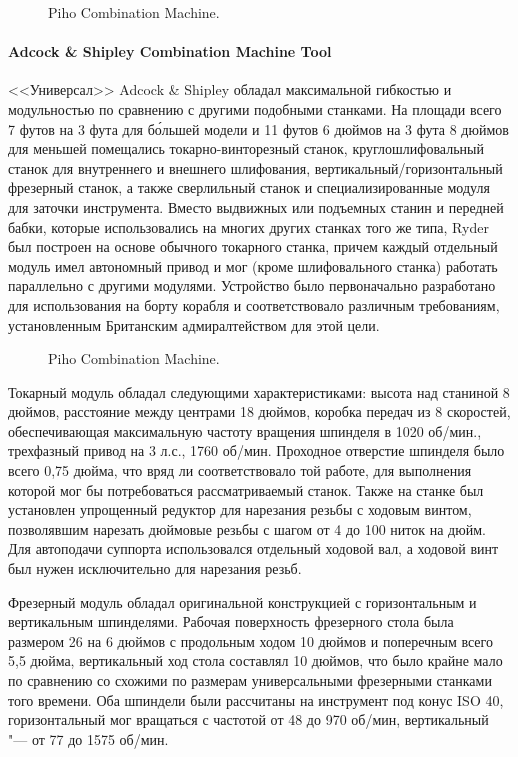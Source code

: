\begin{figure}[ht]
	\caption{Piho Combination Machine.}\label{fig:piho}
\end{figure}

\paragraph{Adcock \& Shipley Combination Machine Tool}

<<Универсал>> Adcock \& Shipley обладал максимальной гибкостью и модульностью по сравнению с другими подобными станками. На площади всего 7 футов на 3 фута для б\'ольшей модели и 11 футов 6 дюймов на 3 фута 8 дюймов для меньшей помещались токарно-винторезный станок, круглошлифовальный станок для внутреннего и внешнего шлифования, вертикальный/горизонтальный фрезерный станок, а также сверлильный станок и специализированные модуля для заточки инструмента. Вместо выдвижных или подъемных станин и передней бабки, которые использовались на многих других станках того же типа, Ryder был построен на основе обычного токарного станка, причем каждый отдельный модуль имел автономный привод и мог (кроме шлифовального станка) работать параллельно с другими модулями. Устройство было первоначально разработано для использования на борту корабля и соответствовало различным требованиям, установленным Британским адмиралтейством для этой цели. 

\begin{figure}[ht]
	\caption{Piho Combination Machine.}\label{fig:adcock-1}
\end{figure}

Токарный модуль обладал следующими характеристиками: высота над станиной 8 дюймов, расстояние между центрами 18 дюймов, коробка передач из 8 скоростей, обеспечивающая максимальную частоту вращения шпинделя в 1020 об/мин., трехфазный привод на 3 л.с., 1760 об/мин. Проходное отверстие шпинделя было всего 0,75 дюйма, что вряд ли соответствовало той работе, для выполнения которой мог бы потребоваться рассматриваемый станок. Также на станке был установлен упрощенный редуктор для нарезания резьбы с ходовым винтом, позволявшим нарезать дюймовые резьбы с шагом от 4 до 100 ниток на дюйм. Для автоподачи суппорта использовался отдельный ходовой вал, а ходовой винт был нужен исключительно для нарезания резьб.

Фрезерный модуль обладал оригинальной конструкцией с горизонтальным и вертикальным шпинделями. Рабочая поверхность фрезерного стола была размером 26 на 6 дюймов с продольным ходом 10 дюймов и поперечным всего 5,5 дюйма, вертикальный ход стола составлял 10 дюймов, что было крайне мало по сравнению со схожими по размерам универсальными фрезерными станками того времени. Оба шпиндели были рассчитаны на инструмент под конус ISO 40, горизонтальный мог вращаться с частотой от 48 до 970 об/мин, вертикальный "--- от 77 до 1575 об/мин.

